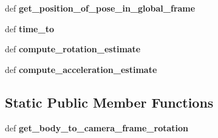 \begin{DoxyCompactItemize}
\item 
\hypertarget{classmsckf_1_1_state_a4d73be1dbaa64387ab9914166a1911c7}{def {\bfseries get\-\_\-position\-\_\-of\-\_\-pose\-\_\-in\-\_\-global\-\_\-frame}}\label{classmsckf_1_1_state_a4d73be1dbaa64387ab9914166a1911c7}

\item 
\hypertarget{classmsckf_1_1_state_a2a4bea03daac8393f9e79478cb1cfc9c}{def {\bfseries time\-\_\-to}}\label{classmsckf_1_1_state_a2a4bea03daac8393f9e79478cb1cfc9c}

\item 
\hypertarget{classmsckf_1_1_state_a87fac63716f6150b0389e14ba5b4f740}{def {\bfseries compute\-\_\-rotation\-\_\-estimate}}\label{classmsckf_1_1_state_a87fac63716f6150b0389e14ba5b4f740}

\item 
\hypertarget{classmsckf_1_1_state_ab3159f30af3ec38d872f93292a9676ab}{def {\bfseries compute\-\_\-acceleration\-\_\-estimate}}\label{classmsckf_1_1_state_ab3159f30af3ec38d872f93292a9676ab}

\end{DoxyCompactItemize}
\subsection*{Static Public Member Functions}
\begin{DoxyCompactItemize}
\item 
\hypertarget{classmsckf_1_1_state_af4664b6f5c6b28f190702944cea1b206}{def {\bfseries get\-\_\-body\-\_\-to\-\_\-camera\-\_\-frame\-\_\-rotation}}\label{classmsckf_1_1_state_af4664b6f5c6b28f190702944cea1b206}

\end{DoxyCompactItemize}
